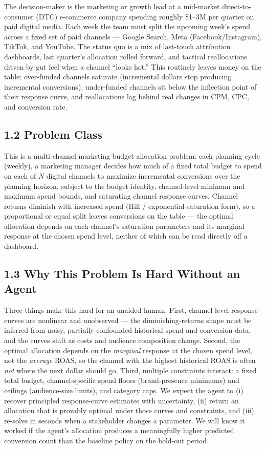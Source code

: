 \documentclass[11pt]{article}
\begin{document}
The decision-maker is the marketing or growth lead at a mid-market direct-to-consumer (DTC) e-commerce company spending roughly \$1--3M per quarter on paid digital media. Each week the team must split the upcoming week's spend across a fixed set of paid channels --- Google Search, Meta (Facebook/Instagram), TikTok, and YouTube. The status quo is a mix of last-touch attribution dashboards, last quarter's allocation rolled forward, and tactical reallocations driven by gut feel when a channel ``looks hot.'' This routinely leaves money on the table: over-funded channels saturate (incremental dollars stop producing incremental conversions), under-funded channels sit below the inflection point of their response curve, and reallocations lag behind real changes in CPM, CPC, and conversion rate.

\subsection*{1.2 \; Problem Class}

This is a multi-channel marketing budget allocation problem: each planning cycle (weekly), a marketing manager decides how much of a fixed total budget to spend on each of $N$ digital channels to maximize incremental conversions over the planning horizon, subject to the budget identity, channel-level minimum and maximum spend bounds, and saturating channel response curves. Channel returns diminish with increased spend (Hill / exponential-saturation form), so a proportional or equal split leaves conversions on the table --- the optimal allocation depends on each channel's saturation parameters and its marginal response at the chosen spend level, neither of which can be read directly off a dashboard.

\subsection*{1.3 \; Why This Problem Is Hard Without an Agent}

Three things make this hard for an unaided human. First, channel-level response curves are nonlinear and unobserved --- the diminishing-returns shape must be inferred from noisy, partially confounded historical spend-and-conversion data, and the curves shift as costs and audience composition change. Second, the optimal allocation depends on the \emph{marginal} response at the chosen spend level, not the \emph{average} ROAS, so the channel with the highest historical ROAS is often \emph{not} where the next dollar should go. Third, multiple constraints interact: a fixed total budget, channel-specific spend floors (brand-presence minimums) and ceilings (audience-size limits), and category caps. We expect the agent to (i) recover principled response-curve estimates with uncertainty, (ii) return an allocation that is provably optimal under those curves and constraints, and (iii) re-solve in seconds when a stakeholder changes a parameter. We will know it worked if the agent's allocation produces a meaningfully higher predicted conversion count than the baseline policy on the hold-out period.
\end{document}

